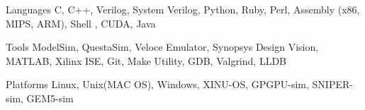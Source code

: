 \par\addvspace{-1ex}


\begin{cvskills}

  \cvskill
    {Languages} %
    {\color{black}C, C++, Verilog, System Verilog, Python, Ruby, Perl, Assembly (x86, MIPS, ARM), Shell , CUDA, Java} %

  \cvskill
    {Tools} %
    {ModelSim, QuestaSim, Veloce Emulator, Synopsys Design Vision, MATLAB, Xilinx ISE, Git, Make Utility, GDB, Valgrind, LLDB} %

    \cvskill
    {Platforms} %
    {Linux, Unix(MAC OS), Windows, XINU-OS, GPGPU-sim, SNIPER-sim, GEM5-sim} %




  

\end{cvskills}
